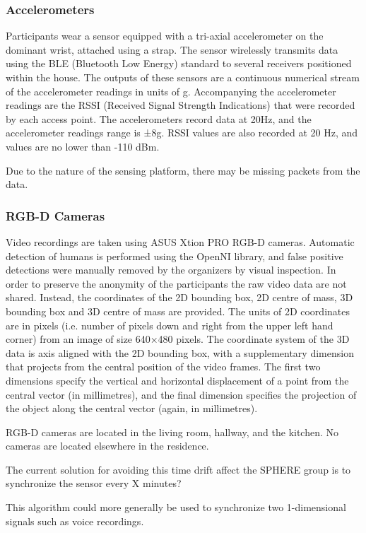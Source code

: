\subsubsection{Accelerometers}
Participants wear a sensor equipped with a tri-axial accelerometer on the dominant wrist, attached using a strap. The sensor wirelessly transmits data using the BLE (Bluetooth Low Energy) standard to several receivers positioned within the house. The outputs of these sensors are a continuous numerical stream of the accelerometer readings in units of g. Accompanying the accelerometer readings are the RSSI (Received Signal Strength Indications) that were recorded by each access point. The accelerometers record data at 20Hz, and the accelerometer readings range is ±8g. RSSI values are also recorded at 20 Hz, and values are no lower than -110 dBm.

Due to the nature of the sensing platform, there may be missing packets from the data.

\subsubsection{RGB-D Cameras}
Video recordings are taken using ASUS Xtion PRO RGB-D cameras. Automatic detection of humans is performed using the OpenNI library, and false positive detections were manually removed by the organizers by visual inspection. In order to preserve the anonymity of the participants the raw video data are not shared. Instead, the coordinates of the 2D bounding box, 2D centre of mass, 3D bounding box and 3D centre of mass are provided. The units of 2D coordinates are in pixels (i.e. number of pixels down and right from the upper left hand corner) from an image of size 640×480 pixels. The coordinate system of the 3D data is axis aligned with the 2D bounding box, with a supplementary dimension that projects from the central position of the video frames. The first two dimensions specify the vertical and horizontal displacement of a point from the central vector (in millimetres), and the final dimension specifies the projection of the object along the central vector (again, in millimetres).

RGB-D cameras are located in the living room, hallway, and the kitchen. No cameras are located elsewhere in the residence.

The current solution for avoiding this time drift affect the SPHERE group is to synchronize the sensor every X minutes?

This algorithm could more generally be used to synchronize two 1-dimensional signals such as voice recordings.

